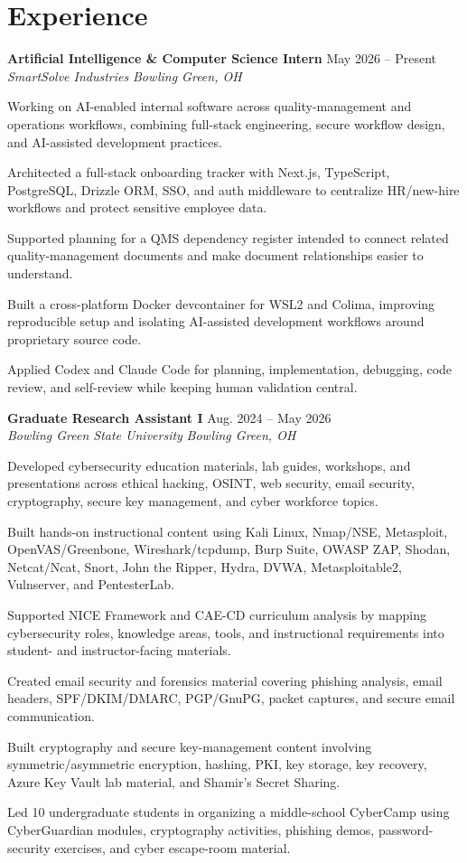 \documentclass[letterpaper,10pt]{article}
\newcommand{\resumeSubheading}[4]{
  \vspace{2pt}
  \textbf{#1} \hfill #2\\
  \textit{#3} \hfill \textit{#4}
}
\begin{document}
\section{Experience}
\resumeSubheading
{Artificial Intelligence \& Computer Science Intern}{May 2026 -- Present}
{SmartSolve Industries}{Bowling Green, OH}
\begin{tightitemize}
  \item Working on AI-enabled internal software across quality-management and operations workflows, combining full-stack engineering, secure workflow design, and AI-assisted development practices.
  \item Architected a full-stack onboarding tracker with Next.js, TypeScript, PostgreSQL, Drizzle ORM, SSO, and auth middleware to centralize HR/new-hire workflows and protect sensitive employee data.
  \item Supported planning for a QMS dependency register intended to connect related quality-management documents and make document relationships easier to understand.
  \item Built a cross-platform Docker devcontainer for WSL2 and Colima, improving reproducible setup and isolating AI-assisted development workflows around proprietary source code.
  \item Applied Codex and Claude Code for planning, implementation, debugging, code review, and self-review while keeping human validation central.
\end{tightitemize}

\resumeSubheading
{Graduate Research Assistant I}{Aug. 2024 -- May 2026}
{Bowling Green State University}{Bowling Green, OH}
\begin{tightitemize}
  \item Developed cybersecurity education materials, lab guides, workshops, and presentations across ethical hacking, OSINT, web security, email security, cryptography, secure key management, and cyber workforce topics.
  \item Built hands-on instructional content using Kali Linux, Nmap/NSE, Metasploit, OpenVAS/Greenbone, Wireshark/tcpdump, Burp Suite, OWASP ZAP, Shodan, Netcat/Ncat, Snort, John the Ripper, Hydra, DVWA, Metasploitable2, Vulnserver, and PentesterLab.
  \item Supported NICE Framework and CAE-CD curriculum analysis by mapping cybersecurity roles, knowledge areas, tools, and instructional requirements into student- and instructor-facing materials.
  \item Created email security and forensics material covering phishing analysis, email headers, SPF/DKIM/DMARC, PGP/GnuPG, packet captures, and secure email communication.
  \item Built cryptography and secure key-management content involving symmetric/asymmetric encryption, hashing, PKI, key storage, key recovery, Azure Key Vault lab material, and Shamir's Secret Sharing.
  \item Led 10 undergraduate students in organizing a middle-school CyberCamp using CyberGuardian modules, cryptography activities, phishing demos, password-security exercises, and cyber escape-room material.
\end{tightitemize}
\end{document}
